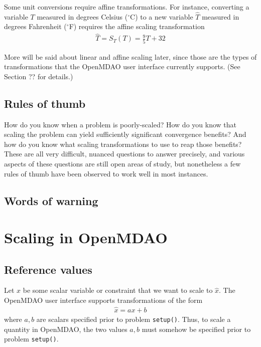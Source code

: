 \documentclass{article}
\begin{document}
\noindent
Some unit conversions require affine transformations. For instance, converting a variable $T$ measured in degrees Celsius ($^{\circ}$C) to a new variable $\hat{T}$ measured in degrees Fahrenheit ($^{\circ}$F) requires the affine scaling transformation
\begin{align*}
    \hat{T} = S_T(T) = \frac{9}{5}T + 32
\end{align*}

\noindent
More will be said about linear and affine scaling later, since those are the types of transformations that the OpenMDAO user interface currently supports. (See Section ?? for details.)

\subsection*{Rules of thumb}

How do you know when a problem is poorly-scaled? How do you know that scaling the
problem can yield sufficiently significant convergence benefits? And how do you know what scaling transformations to use to reap those benefits? These are all very difficult, nuanced questions to answer precisely, and various aspects of these questions are still open areas of study, but nonetheless a few rules of thumb have been observed to work well in most instances.

\subsection*{Words of warning}

\newpage
\section{Scaling in OpenMDAO}

\subsection*{Reference values}

Let $x$ be some scalar variable or constraint that we want to scale to $\hat{x}$. The OpenMDAO user interface supports transformations of the form
\begin{align*}
    \hat{x} = a x + b
\end{align*}
where $a,b$ are scalars specified prior to problem \texttt{setup()}. Thus, to scale a quantity in OpenMDAO, the two values $a,b$ must somehow be specified prior to problem \texttt{setup()}.
\end{document}
